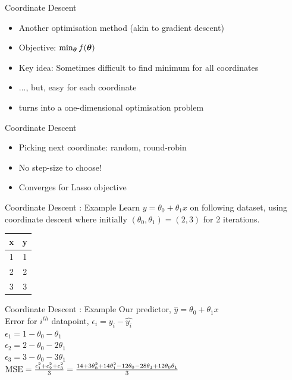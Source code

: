 \documentclass{beamer}
\begin{document}
\begin{frame}{Coordinate Descent}
\begin{itemize}[<+->]
	\item Another optimisation method (akin to gradient descent)
	\item Objective: $\min_{\boldsymbol{\theta}} f(\boldsymbol{\theta})$
	\item Key idea: Sometimes difficult to find minimum for all coordinates
	\item ..., but, easy for each coordinate
	\item turns into a one-dimensional optimisation problem
\end{itemize}
\end{frame}

%


\begin{frame}{Coordinate Descent}
\begin{itemize}[<+->]
\item Picking next coordinate: \pause random, round-robin
\item No step-size to choose!
\item Converges for Lasso objective
\end{itemize}
\end{frame}




\begin{frame}{Coordinate Descent : Example}
Learn $y = \theta_0 + \theta_1 x$ on following dataset, using coordinate descent where initially $(\theta_0, \theta_1) = (2,3)$  for 2 iterations. 
\begin{table}[]
\centering
\label{tab:my-table}
\begin{tabular}{|c|c|}
\hline
\textbf{x} & \textbf{y} \\ \hline
1 & 1 \\ \hline
2 & 2 \\ \hline
3 & 3 \\ \hline
\end{tabular}
\end{table}
\end{frame}



\begin{frame}{Coordinate Descent : Example}
Our predictor, $\hat{y} = \theta_0 + \theta_1x$\\
\vspace{1cm}
Error for $i^{th}$ datapoint, $\epsilon_i = y_i - \hat{y_i}$\\
$\epsilon_1 = 1 - \theta_0 - \theta_1$ \\
$\epsilon_2 = 2 - \theta_0 - 2\theta_1$ \\
$\epsilon_3 = 3 - \theta_0 - 3\theta_1$ \\

\vspace{1cm}
$\operatorname{MSE} = \frac{\epsilon_1^2 + \epsilon_2^2 + \epsilon_3^2}{3} = \frac{14 + 3\theta_0^2 + 14\theta_1^2 -12\theta_0 - 28\theta_1 + 12\theta_0\theta_1}{3}$\\
\end{frame}
\end{document}
